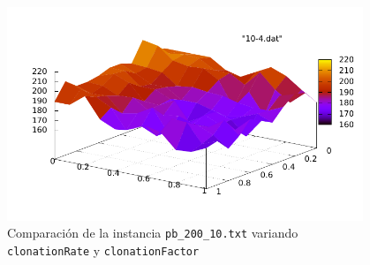\newpage 
\begin{figure}[h!]
\begin{center}
	\includegraphics[width=0.95\textwidth]{img/10-4.pdf}
	\caption{Comparaci\'on de la instancia \texttt{pb\_200\_10.txt} variando \texttt{clonationRate} y \texttt{clonationFactor}}
	\label{fig:4-3}
\end{center}
\end{figure}


\newpage
%
%
